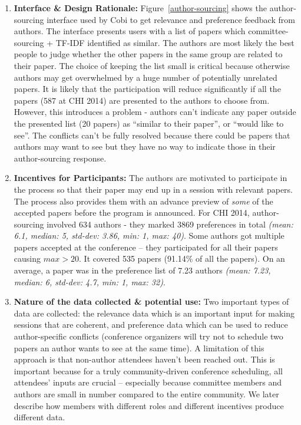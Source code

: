 \documentclass[letterpaper]{article}
\begin{document}
\begin{enumerate}[I]
\item \textbf{Interface \& Design Rationale:} Figure~\ref{author-sourcing} shows the author-sourcing interface used by Cobi to get relevance and preference feedback from authors. The interface presents users with a list of papers which committee-sourcing + TF-IDF identified as similar. The authors are most likely the best people to judge whether the other papers in the same group are related to their paper. The choice of keeping the list small is critical because otherwise authors may get overwhelmed by a huge number of potentially unrelated papers. It is likely that the participation will reduce significantly if all the papers (587 at CHI 2014) are presented to the authors to choose from. However, this introduces a problem - authors can't indicate any paper outside the presented list (20 papers) as ``similar to their paper'', or ``would like to see''. The conflicts can't be fully resolved because there could be papers that authors may want to see but they have no way to indicate those in their author-sourcing response.

\item \textbf{Incentives for Participants:} The authors are motivated to participate in the process so that their paper may end up in a session with relevant papers. The process also provides them with an advance preview of \emph{some} of the accepted papers before the program is announced. For CHI 2014, author-sourcing involved 634 authors - they marked 3869 preferences in total \emph{(mean: 6.1, median: 5, std-dev: 3.86, min: 1, max: 40)}. Some authors got multiple papers accepted at the conference -- they participated for all their papers causing  $max > 20$. It covered 535 papers (91.14\% of all the papers). On an average, a paper was in the preference list of 7.23 authors \emph{(mean: 7.23, median: 6, std-dev: 4.7, min: 1, max: 32)}.

\item \textbf{Nature of the data collected \& potential use:} Two important types of data are collected: the relevance data which is an important input for making sessions that are coherent, and preference data which can be used to reduce author-specific conflicts (conference organizers will try not to schedule two papers an author wants to see at the same time). A limitation of this approach is that non-author attendees haven't been reached out. This is important because for a truly community-driven conference scheduling, all attendees' inputs are crucial -- especially because committee members and authors are small in number compared to the entire community. We later describe how members with different roles and different incentives produce different data.
\end{enumerate}
\end{document}
